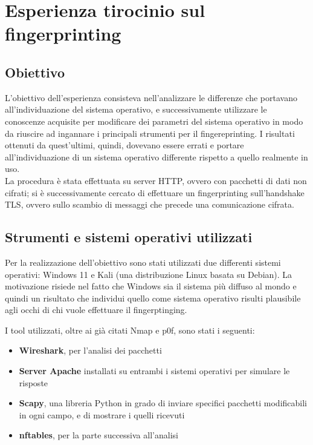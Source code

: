 \chapter{Esperienza tirocinio sul fingerprinting}

\section{Obiettivo}
L'obiettivo dell'esperienza consisteva nell'analizzare le differenze che portavano all'individuazione del sistema operativo, e successivamente utilizzare le conoscenze acquisite per modificare dei parametri del sistema operativo in modo da riuscire ad ingannare i principali strumenti per il fingereprinting.
I risultati ottenuti da quest'ultimi, quindi, dovevano essere errati e portare all'individuazione di un sistema operativo differente rispetto a quello realmente in uso.\\
La procedura è stata effettuata su server HTTP, ovvero con pacchetti di dati non cifrati; si è successivamente cercato di effettuare un fingerprinting sull'handshake TLS, ovvero sullo scambio di messaggi che precede una comunicazione cifrata.

\section{Strumenti e sistemi operativi utilizzati}
Per la realizzazione dell'obiettivo sono stati utilizzati due differenti sistemi operativi: Windows 11 e Kali (una distribuzione Linux basata su Debian).
La motivazione risiede nel fatto che Windows sia il sistema più diffuso al mondo e quindi un risultato che individui quello come sistema operativo risulti plausibile agli occhi di chi vuole effettuare il fingerptinging.

I tool utilizzati, oltre ai già citati Nmap e p0f, sono stati i seguenti:
\begin{itemize}
	\item \textbf{Wireshark}, per l'analisi dei pacchetti
	\item \textbf{Server Apache} installati su entrambi i sistemi operativi per simulare le risposte
	\item \textbf{Scapy}, una libreria Python in grado di inviare specifici pacchetti modificabili in ogni campo, e di mostrare i quelli ricevuti
	\item \textbf{nftables}, per la parte successiva all'analisi
\end{itemize}





